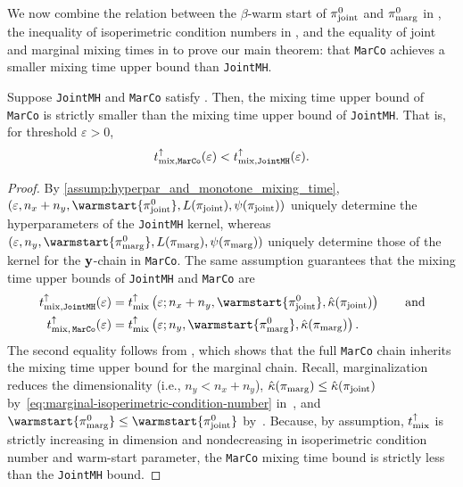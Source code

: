 \documentclass[onefignum,onetabnum]{siamonline250211}
\newcommand{\isocond}{\hat\kappa}
\newcommand{\bfy}{{\bf y}}
\newcommand{\nx}{{n_{x}}}
\newcommand{\ny}{{n_{y}}}
\newcommand{\pjoint}{\pi_{\rm joint}}
\newcommand{\pmarg}{\pi_{\rm marg}}
\newcommand{\MarCo}{\textnormal{\texttt{MarCo}}\xspace}
\newcommand{\Joint}{\textnormal{\texttt{JointMH}}\xspace}
\begin{document}
We now combine the relation between the $\beta$-warm start of $\pjoint^0$ and $\pmarg^0$ in , the inequality of isoperimetric condition numbers in , and the equality of joint and marginal mixing times in  to prove our main theorem: that \MarCo achieves a smaller mixing time upper bound than \Joint.

\begin{theorem} \label{thm:mixing_M_le_J}
Suppose \Joint and \MarCo satisfy .
%
  Then, the mixing time upper bound of \MarCo is strictly smaller than the mixing time upper bound of \Joint.
  That is, for threshold $\varepsilon > 0$,
  \begin{equation}
    \label{eq:mixing_time_M_le_J_weak}
    t_{\rm mix, \MarCo}^{\uparrow}(\varepsilon)
    < t_{\rm mix, \Joint}^{\uparrow}(\varepsilon).
  \end{equation}

\end{theorem}

\begin{proof}
%
By \ref{assump:hyperpar_and_monotone_mixing_time}, %
$(\varepsilon,\nx + \ny,\warmstart{\pjoint^0}, L(\pjoint),\psi(\pjoint))$ uniquely determine the hyperparameters of the \Joint kernel, whereas $(\varepsilon,\ny,\warmstart{\pmarg^0}, L(\pmarg),\psi(\pmarg))$ uniquely determine those of the kernel for the $\bfy$-chain in \MarCo.
%
The same assumption guarantees that the mixing time upper bounds of \Joint and \MarCo are
  \begin{align*}
    t_{\rm mix,\Joint}^\uparrow(\varepsilon)
    &= t_{\rm mix}^\uparrow
      \left(\varepsilon; \nx+\ny,\warmstart{\pjoint^0},\isocond(\pjoint)\right) \qquad \text{and}\\
     t_{\rm mix,\,\MarCo}^\uparrow(\varepsilon)
    &= t_{\rm mix}^\uparrow
      \left(\varepsilon; \ny,\warmstart{\pmarg^0},\isocond(\pmarg)\right).
  \end{align*}
%
%
%
%
  The second equality follows from , which shows that the full \MarCo chain inherits the mixing time upper bound for the marginal chain.
  Recall, marginalization reduces the dimensionality (i.e., $\ny < \nx+\ny$), $\isocond(\pmarg) \leq \isocond(\pjoint)$ by~\eqref{eq:marginal-isoperimetric-condition-number} in~, and $\warmstart{\pmarg^0} \leq \warmstart{\pjoint^0}$ by~.
  Because, by assumption, $t_{\rm mix}^\uparrow$ is strictly increasing in dimension and nondecreasing in isoperimetric condition number and warm-start parameter, the \MarCo mixing time bound is strictly less than the \Joint bound.
%
\end{proof}
\end{document}
